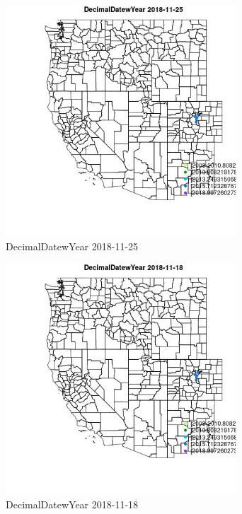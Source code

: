\begin{figure} 
\centering  
\includegraphics[width=0.77\textwidth]{Code_Outputs/Report_ML_input_PM25_Step4_part_e_de_duplicated_aveswNAs_MapObsDecimalDatewYear2018-11-25.jpg} 
\caption{\label{fig:Report_ML_input_PM25_Step4_part_e_de_duplicated_aveswNAsMapObsDecimalDatewYear2018-11-25}DecimalDatewYear 2018-11-25} 
\end{figure} 
 

\clearpage 

\begin{figure} 
\centering  
\includegraphics[width=0.77\textwidth]{Code_Outputs/Report_ML_input_PM25_Step4_part_e_de_duplicated_aveswNAs_MapObsDecimalDatewYear2018-11-18.jpg} 
\caption{\label{fig:Report_ML_input_PM25_Step4_part_e_de_duplicated_aveswNAsMapObsDecimalDatewYear2018-11-18}DecimalDatewYear 2018-11-18} 
\end{figure} 
 

